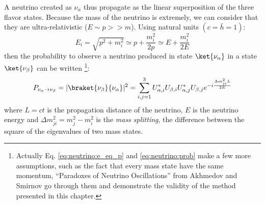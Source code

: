A neutrino created as $\nu_\alpha$ thus propagate as the linear superposition of the three flavor states. Because the mass of the neutrino is extremely, we can consider that they are ultra-relativistic ($E \sim p >> m$). Using natural units $(c = \bar{h} = 1)$:
\begin{equation}
  \label{eq:neutrino:e_eq_p}
  E_i = \sqrt{p^2 + m_i^2} \simeq p + \frac{m_i^2}{2p} \simeq E + \frac{m_i^2}{2E}
\end{equation}
then the probability to observe a neutrino produced in state $\ket{\nu_\alpha}$ in a state $\ket{\nu_\beta}$ can be written \footnote{Actually Eq. \ref{eq:neutrino:e_eq_p} and \ref{eq:neutrino:prob} make a few more assumptions, such as the fact that every mass state have the same momentum, ``Paradoxes of Neutrino Oscillations'' from Akhmedov and Smirnov \cite{akhmedov_paradoxes_2009} go through them and demonstrate the validity of the method presented in this chapter.}:
\begin{equation}
  \label{eq:neutrino:prob}
  P_{\nu_\alpha \rightarrow \nu_\beta} = | \braket{\nu_\beta}{\nu_\alpha} |^2 = \sum_{i,j=1}^3 U^*_{\alpha,i} U_{\beta,i} U^*_{\alpha, j} U_{\beta, j} e^{-i \frac{\Delta m^2_{ji} L}{2E}}
\end{equation}
where $L = ct$ is the propagation distance of the neutrino, $E$ is the neutrino energy and $\Delta m^2_{ji} = m^2_j - m^2_i$ is the \textit{mass splitting}, the difference between the square of the eigenvalues of two mass states.

